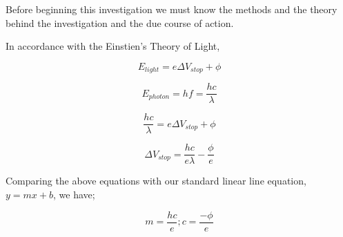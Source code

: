 {Before beginning this investigation we must know the methods and the theory behind the investigation and the due course of action.}

{In accordance with the Einstien's Theory of Light,}

	$$E_{light}  =e\Delta V_{stop} + \phi$$

	$$E_{photon} = hf = \frac{hc}{\lambda}$$
	
	$$\frac{hc}{\lambda} = e\Delta V_{stop} + \phi$$
	
	$$\Delta V_{stop} = \frac{hc}{e\lambda} - \frac{\phi}{e}$$
	
{Comparing the above equations with our standard linear line equation, $y = mx + b$, we have;}

	$$m = \frac{hc}{e}; c = \frac{-\phi}{e}$$	
			